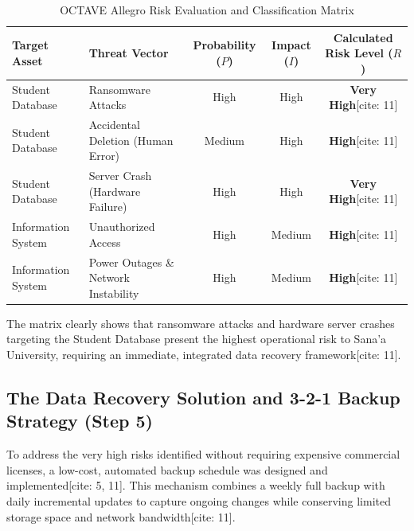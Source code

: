\documentclass[journal,onecolumn,12pt,twoside]{IEEEtran}
\begin{document}
	\begin{table}[htbp]
		\caption{OCTAVE Allegro Risk Evaluation and Classification Matrix}
		\label{tab:risk_matrix}
		\centering
		\begin{tabular}{l p{5cm} c c c}
			\toprule
			\textbf{Target Asset} & \textbf{Threat Vector} & \textbf{Probability ($P$)} & \textbf{Impact ($I$)} & \textbf{Calculated Risk Level ($R$)} \\
			\midrule
			Student Database & Ransomware Attacks & High & High & \textbf{Very High}[cite: 11] \\
			Student Database & Accidental Deletion (Human Error) & Medium & High & \textbf{High}[cite: 11] \\
			Student Database & Server Crash (Hardware Failure) & High & High & \textbf{Very High}[cite: 11] \\
			\addlinespace
			Information System & Unauthorized Access & High & Medium & \textbf{High}[cite: 11] \\
			Information System & Power Outages \& Network Instability & High & Medium & \textbf{High}[cite: 11] \\
			\bottomrule
		\end{tabular}
	\end{table}
	
	The matrix clearly shows that ransomware attacks and hardware server crashes targeting the Student Database present the highest operational risk to Sana'a University, requiring an immediate, integrated data recovery framework[cite: 11].
	
	\subsection{The Data Recovery Solution and 3-2-1 Backup Strategy (Step 5)}
	\label{subsec:results_step5_backup}
	To address the very high risks identified without requiring expensive commercial licenses, a low-cost, automated backup schedule was designed and implemented[cite: 5, 11]. This mechanism combines a weekly full backup with daily incremental updates to capture ongoing changes while conserving limited storage space and network bandwidth[cite: 11]. 
	
\end{document}
